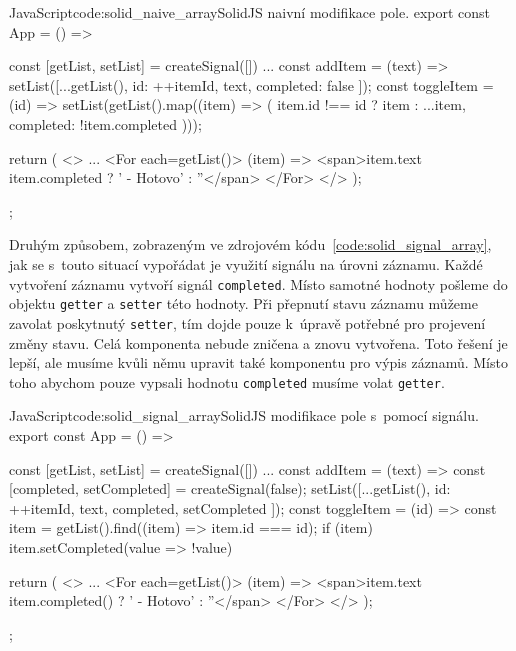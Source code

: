 \documentclass[
  master,
  program=ainf,
  tables=false,
  sourcecodes,
  glossaries,
  index
]{kidiplom}
\begin{document}
  \begin{kicode}{JavaScript}{code:solid_naive_array}{SolidJS naivní modifikace pole.}
    export const App = () => {
      const [getList, setList] = createSignal([])
      ...
      const addItem = (text) => {
        setList([...getList(), { id: ++itemId, text, completed: false }]);
      }
      const toggleItem = (id) => {
        setList(getList().map((item) => (
          item.id !== id ? item : { ...item, completed: !item.completed }
        )));
      }

      return (
        <>
          ...
          <For each={getList()}>
            {(item) => {<span>{item.text} {item.completed ? ' - Hotovo' : ''</span>} }}
          </For>
        </>
      );
    };
\end{kicode}

Druhým způsobem, zobrazeným ve zdrojovém kódu~\ref{code:solid_signal_array}, jak se s~touto situací vypořádat 
je využití signálu na úrovni záznamu. Každé vytvoření
záznamu vytvoří signál {\tt completed}. Místo samotné hodnoty pošleme do objektu {\tt getter} a {\tt setter} této hodnoty.
Při přepnutí stavu záznamu můžeme zavolat poskytnutý {\tt setter}, tím dojde pouze k~úpravě potřebné pro projevení
změny stavu. Celá komponenta nebude zničena a znovu vytvořena. Toto řešení je lepší, ale musíme kvůli němu
upravit také komponentu pro výpis záznamů. Místo toho abychom pouze vypsali hodnotu {\tt completed} musíme volat
{\tt getter}.

  \begin{kicode}{JavaScript}{code:solid_signal_array}{SolidJS modifikace pole s~pomocí signálu.}
    export const App = () => {
      const [getList, setList] = createSignal([])
      ...
      const addItem = (text) => {
        const [completed, setCompleted] = createSignal(false); 
        setList([...getList(), { id: ++itemId, text, completed, setCompleted }]);
      }
      const toggleItem = (id) => {
        const item = getList().find((item) => item.id === id);
        if (item) item.setCompleted(value => !value)
      }

      return (
        <>
          ...
          <For each={getList()}>
            {(item) => {<span>{item.text} {item.completed() ? ' - Hotovo' : ''</span>} }}
          </For>
        </>
      );
    };
\end{kicode}
\end{document}

